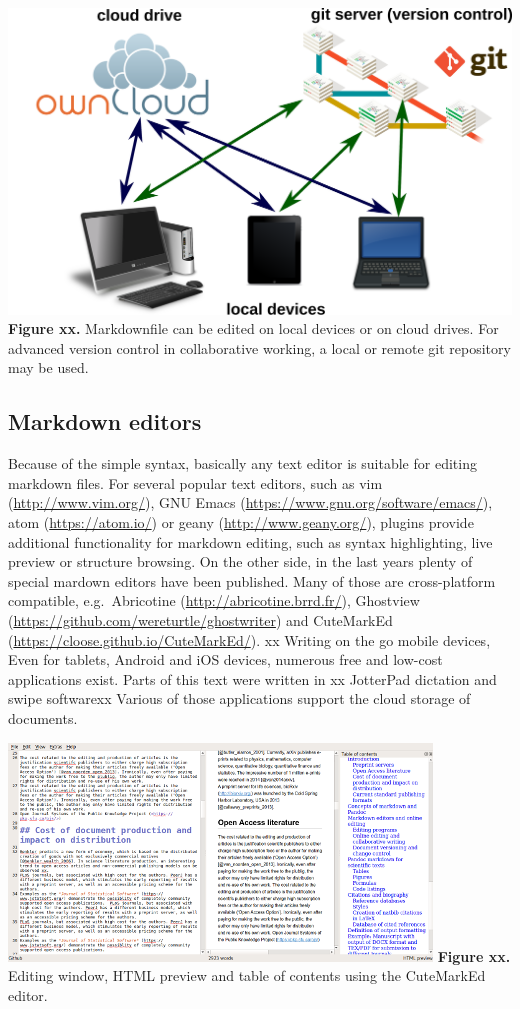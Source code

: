 \documentclass[10pt,fleqn]{wlpeerj}
\begin{document}
\includegraphics{fig-editing-options.png}\\
\textbf{Figure
xx.}
Markdownfile
can
be
edited
on
local
devices
or on
cloud
drives.
For
advanced
version
control
in
collaborative
working,
a
local
or
remote
git
repository
may
be
used.

\subsection{Markdown
editors}\label{markdown-editors}

Because
of
the
simple
syntax,
basically
any
text
editor
is
suitable
for
editing
markdown
files.
For
several
popular
text
editors,
such
as
vim
(\url{http://www.vim.org/}),
GNU
Emacs
(\url{https://www.gnu.org/software/emacs/}),
atom
(\url{https://atom.io/})
or
geany
(\url{http://www.geany.org/}),
plugins
provide
additional
functionality
for
markdown
editing,
such
as
syntax
highlighting,
live
preview
or
structure
browsing.
On
the
other
side,
in
the
last
years
plenty
of
special
mardown
editors
have
been
published.
Many
of
those
are
cross-platform
compatible,
e.g.~Abricotine
(\url{http://abricotine.brrd.fr/}),
Ghostview
(\url{https://github.com/wereturtle/ghostwriter})
and
CuteMarkEd
(\url{https://cloose.github.io/CuteMarkEd/}).
xx
Writing
on
the
go
mobile
devices,
Even
for
tablets,
Android
and
iOS
devices,
numerous
free
and
low-cost
applications
exist.
Parts
of
this
text
were
written
in xx
JotterPad
dictation
and
swipe
softwarexx
Various
of
those
applications
support
the
cloud
storage
of
documents.

\includegraphics{fig-cutemarked-editor.png}
\textbf{Figure
xx.}
Editing
window,
HTML
preview
and
table
of
contents
using
the
CuteMarkEd
editor.
\end{document}
